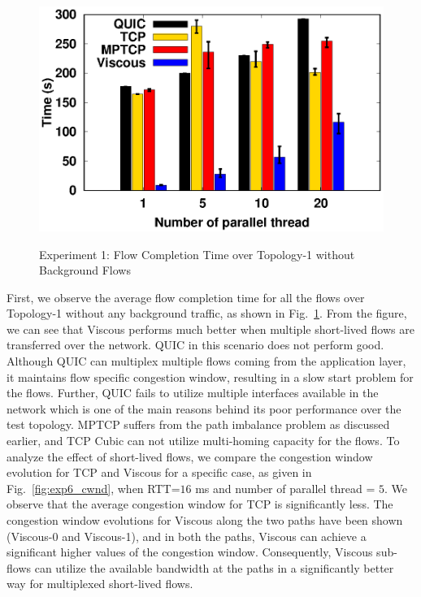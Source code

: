 \begin{figure}[!t]
\begin{center}
\begin{minipage}{0.45\linewidth}
        \end{minipage}
        \begin{minipage}{0.45\linewidth}
            \centering
            \includegraphics[width=0.24\linewidth]{img/exp6/time_elapsed_20}
            \label{fig:exp6_time_320}
        \end{minipage}
        \caption{\label{fig:exp6_time}Experiment 1: Flow Completion Time over Topology-1 without Background Flows}
    \end{center}
\end{figure}


First, we observe the average flow completion time for all the flows over Topology-1 without any background traffic, as shown in Fig.~\ref{fig:exp6_time}. From the figure, we can see that Viscous performs much better when multiple short-lived flows are transferred over the network. QUIC in this scenario does not perform good. Although QUIC can multiplex multiple flows coming from the application layer, it maintains flow specific congestion window, resulting in a slow start problem for the flows. Further, QUIC fails to utilize multiple interfaces available in the network which is one of the main reasons behind its poor performance over the test topology. MPTCP suffers from the path imbalance problem as discussed earlier, and TCP Cubic can not utilize multi-homing capacity for the flows. To analyze the effect of short-lived flows, we compare the congestion window evolution for TCP and Viscous for a specific case, as given in Fig.~\ref{fig:exp6_cwnd}, when RTT=$16$ ms and number of parallel thread = $5$. We observe that the average congestion window for TCP is significantly less. The congestion window evolutions for Viscous along the two paths have been shown (Viscous-0 and Viscous-1), and in both the paths, Viscous can achieve a significant higher values of the congestion window. Consequently, Viscous sub-flows can utilize the available bandwidth at the paths in a significantly better way for multiplexed short-lived flows. 

